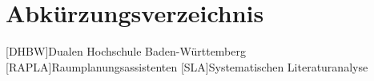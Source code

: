 \chapter*{Abkürzungsverzeichnis}

\begin{acronym}[RAPLA] 
[DHBW]{Dualen Hochschule Baden-Württemberg}
[RAPLA]{Raumplanungsassistenten}
[SLA]{Systematischen Literaturanalyse}

\end{acronym}